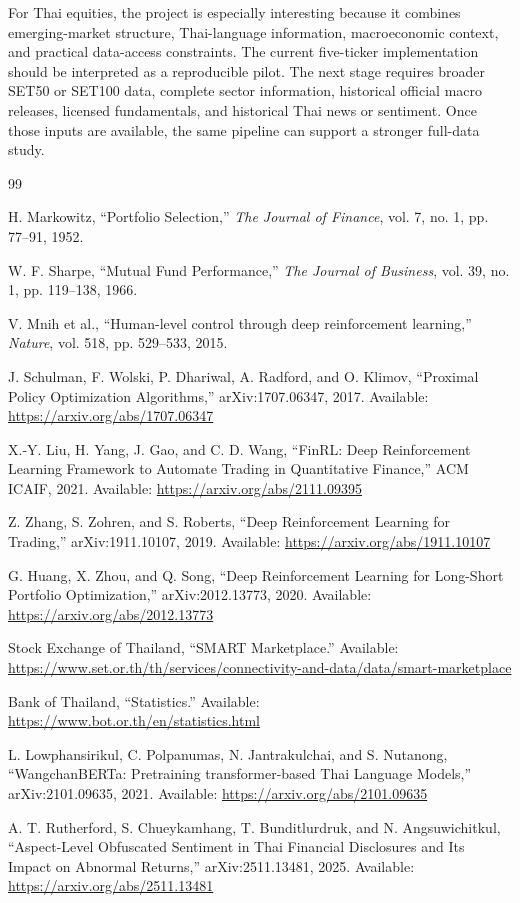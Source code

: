 \documentclass[11pt]{article}
\begin{document}
For Thai equities, the project is especially interesting because it combines emerging-market structure, Thai-language information, macroeconomic context, and practical data-access constraints. The current five-ticker implementation should be interpreted as a reproducible pilot. The next stage requires broader SET50 or SET100 data, complete sector information, historical official macro releases, licensed fundamentals, and historical Thai news or sentiment. Once those inputs are available, the same pipeline can support a stronger full-data study.

\begin{thebibliography}{99}

H. Markowitz, ``Portfolio Selection,'' \textit{The Journal of Finance}, vol. 7, no. 1, pp. 77--91, 1952.

W. F. Sharpe, ``Mutual Fund Performance,'' \textit{The Journal of Business}, vol. 39, no. 1, pp. 119--138, 1966.

V. Mnih et al., ``Human-level control through deep reinforcement learning,'' \textit{Nature}, vol. 518, pp. 529--533, 2015.

J. Schulman, F. Wolski, P. Dhariwal, A. Radford, and O. Klimov, ``Proximal Policy Optimization Algorithms,'' arXiv:1707.06347, 2017. Available: \url{https://arxiv.org/abs/1707.06347}

X.-Y. Liu, H. Yang, J. Gao, and C. D. Wang, ``FinRL: Deep Reinforcement Learning Framework to Automate Trading in Quantitative Finance,'' ACM ICAIF, 2021. Available: \url{https://arxiv.org/abs/2111.09395}

Z. Zhang, S. Zohren, and S. Roberts, ``Deep Reinforcement Learning for Trading,'' arXiv:1911.10107, 2019. Available: \url{https://arxiv.org/abs/1911.10107}

G. Huang, X. Zhou, and Q. Song, ``Deep Reinforcement Learning for Long-Short Portfolio Optimization,'' arXiv:2012.13773, 2020. Available: \url{https://arxiv.org/abs/2012.13773}

Stock Exchange of Thailand, ``SMART Marketplace.'' Available: \url{https://www.set.or.th/th/services/connectivity-and-data/data/smart-marketplace}

Bank of Thailand, ``Statistics.'' Available: \url{https://www.bot.or.th/en/statistics.html}

L. Lowphansirikul, C. Polpanumas, N. Jantrakulchai, and S. Nutanong, ``WangchanBERTa: Pretraining transformer-based Thai Language Models,'' arXiv:2101.09635, 2021. Available: \url{https://arxiv.org/abs/2101.09635}

A. T. Rutherford, S. Chueykamhang, T. Bunditlurdruk, and N. Angsuwichitkul, ``Aspect-Level Obfuscated Sentiment in Thai Financial Disclosures and Its Impact on Abnormal Returns,'' arXiv:2511.13481, 2025. Available: \url{https://arxiv.org/abs/2511.13481}

\end{thebibliography}
\end{document}

